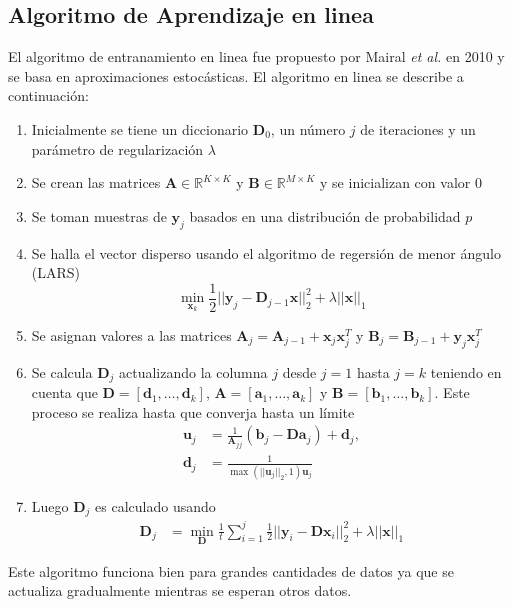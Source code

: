 \subsection{Algoritmo de Aprendizaje en linea}
El algoritmo de entranamiento en linea fue propuesto por Mairal \textit{et al.} en 2010 \cite{online} y se basa en aproximaciones estoc\'asticas. El algoritmo en linea se describe a continuaci\'on:
\begin{enumerate}
\item Inicialmente se tiene un diccionario $\bm{D}_0$, un n\'umero $j$ de iteraciones y un par\'ametro de regularizaci\'on $\lambda$
\item Se crean las matrices $\bm{A} \in \mathbb{R}^{K \times K}$ y  $\bm{B} \in \mathbb{R}^{M \times K}$ y se inicializan con valor 0
\item Se toman muestras de $\bm{y}_j$ basados en una distribuci\'on de probabilidad $p$
\item Se halla el vector disperso usando el algoritmo de regersi\'on de menor \'angulo (LARS) \cite{lars}
\begin{equation}
\min_{\bm{x}_k} \frac{1}{2}||\bm{y}_j-\bm{D}_{j-1}\bm{x}||^2_2+\lambda||\bm{x}||_1
\end{equation}
\item Se asignan valores a las matrices $\bm{A}_j = \bm{A}_{j-1}+\bm{x}_j\bm{x}_j^T$ y $\bm{B}_j = \bm{B}_{j-1}+\bm{y}_j\bm{x}_j^T$ 
\item Se calcula $\bm{D}_j$ actualizando la columna $j$ desde $j=1$ hasta $j=k$ teniendo en cuenta que $\bm{D} =[\bm{d}_1, \ldots, \bm{d}_k]$, $\bm{A} =[\bm{a}_1, \ldots, \bm{a}_k]$ y $\bm{B} =[\bm{b}_1, \ldots, \bm{b}_k]$. Este proceso se realiza hasta que converja hasta un l\'imite
\begin{align}
\bm{u}_j &= \frac{1}{\bm{A}_{jj}}(\bm{b}_j - \bm{Da}_j) + \bm{d}_j, \\
\bm{d}_j &= \frac{1}{\max(||\bm{u}_j||_2, 1)\bm{u}_j}
\end{align}
\item Luego $\bm{D}_j$ es calculado usando
\begin{align}
\bm{D}_j &= \min_{\bm{D}} \frac{1}{t}\sum \limits_{i=1}^j\frac{1}{2}||\bm{y}_i-\bm{Dx}_i||_2^2+\lambda||\bm{x}||_1
\end{align}
\end{enumerate}

Este algoritmo funciona bien para grandes cantidades de datos ya que se actualiza gradualmente mientras se esperan otros datos.


